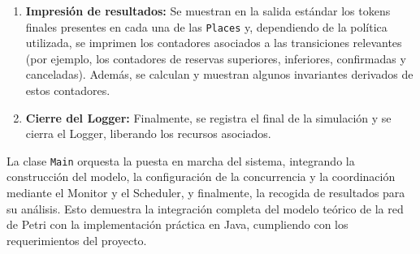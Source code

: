 \documentclass[12pt]{article}
\begin{document}
\begin{enumerate}
    \item \textbf{Impresión de resultados:}  
    Se muestran en la salida estándar los tokens finales presentes en cada una de las \texttt{Places} y, dependiendo de la política utilizada, se imprimen los contadores asociados a las transiciones relevantes (por ejemplo, los contadores de reservas superiores, inferiores, confirmadas y canceladas). Además, se calculan y muestran algunos invariantes derivados de estos contadores.

    \item \textbf{Cierre del Logger:}  
    Finalmente, se registra el final de la simulación y se cierra el Logger, liberando los recursos asociados.
\end{enumerate}

La clase \texttt{Main} orquesta la puesta en marcha del sistema, integrando la construcción del modelo, la configuración de la concurrencia y la coordinación mediante el Monitor y el Scheduler, y finalmente, la recogida de resultados para su análisis. Esto demuestra la integración completa del modelo teórico de la red de Petri con la implementación práctica en Java, cumpliendo con los requerimientos del proyecto.
\end{document}

